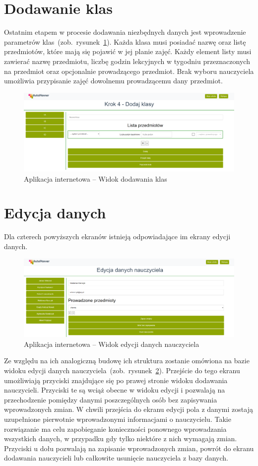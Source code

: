 \section{Dodawanie klas}
Ostatnim etapem w procesie dodawania niezbędnych danych jest wprowadzenie parametrów klas~(zob.~rysunek~\ref{rys:class}). Każda klasa musi posiadać nazwę oraz listę przedmiotów, które mają się pojawić w jej planie zajęć. Każdy element listy musi zawierać nazwę przedmiotu, liczbę godzin lekcyjnych w tygodniu przeznaczonych na przedmiot oraz opcjonalnie prowadzącego przedmiot. Brak wyboru nauczyciela umożliwia przypisanie zajęć dowolnemu prowadzącemu dany przedmiot.
\begin{figure}[!ht]
\centering\includegraphics[width=\textwidth]{figures/class}
\caption{Aplikacja internetowa -- Widok dodawania klas}\label{rys:class}
\end{figure}
\section{Edycja danych}
Dla czterech powyższych ekranów istnieją odpowiadające im ekrany edycji danych.

\begin{figure}[h]
\centering\includegraphics[width=\textwidth]{figures/edit}
\caption{Aplikacja internetowa -- Widok edycji danych nauczyciela}\label{rys:edit}
\end{figure}

Ze względu na ich analogiczną budowę ich struktura zostanie omówiona na bazie widoku edycji danych nauczyciela~(zob.~rysunek~\ref{rys:edit}). Przejście do tego ekranu umożliwiają przyciski znajdujące się po prawej stronie widoku dodawania nauczycieli. Przyciski te są wciąż obecne w widoku edycji i pozwalają na przechodzenie pomiędzy danymi poszczególnych osób bez zapisywania wprowadzonych zmian. W chwili przejścia do ekranu edycji pola z danymi zostają uzupełnione pierwotnie wprowadzonymi informacjami o nauczycielu. Takie rozwiązanie ma celu zapobieganie konieczności ponownego wprowadzania wszystkich danych, w przypadku gdy tylko niektóre z nich wymagają zmian. Przyciski u dołu pozwalają na zapisanie wprowadzonych zmian, powrót do ekranu dodawania nauczycieli lub całkowite usunięcie nauczyciela z bazy danych.
